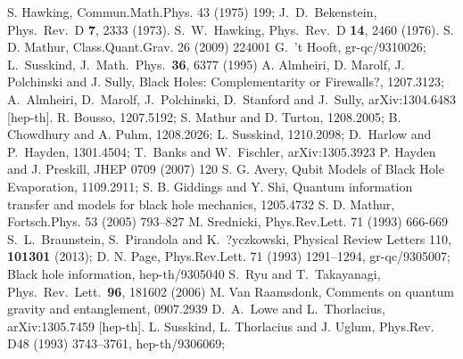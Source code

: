 \documentclass[12pt,onecolumn,aps,prd,nofootinbib,superscriptaddress,amssymb]{revtex4-1}
\begin{document}
\begin{thebibliography}{99}
 S. Hawking, %
Commun.Math.Phys. 43 (1975) 199;   J.~D.~Bekenstein, %
 Phys.\ Rev.\ D {\bf 7}, 2333 (1973).
   S.~W.~Hawking,
  Phys.\ Rev.\ D {\bf 14}, 2460 (1976).
    S. D. Mathur, %
 Class.Quant.Grav. 26 (2009) 224001%
  G.~'t Hooft,   gr-qc/9310026;  L.~Susskind,   J.\ Math.\ Phys.\  {\bf 36}, 6377 (1995) 
 A. Almheiri, D. Marolf, J. Polchinski and J. Sully, Black Holes: Complementarity or Firewalls?, 1207.3123;
 A.~Almheiri, D.~Marolf, J.~Polchinski, D.~Stanford and J.~Sully,
    arXiv:1304.6483 [hep-th].
R. Bousso, 1207.5192;
S. Mathur and D. Turton,   1208.2005;
B. Chowdhury and A. Puhm, 1208.2026;  
L. Susskind,  1210.2098; D.~Harlow and P.~Hayden, 1301.4504; T.~Banks and W.~Fischler,
 arXiv:1305.3923 
  P. Hayden and J. Preskill, %
JHEP 0709 (2007) 120
         S. G. Avery, Qubit Models of Black Hole Evaporation, 1109.2911;
S. B. Giddings and Y. Shi, Quantum information transfer and models for black hole mechanics, 1205.4732
        S. D. Mathur,  Fortsch.Phys. 53 (2005) 793--827
   M. Srednicki, Phys.Rev.Lett. 71 (1993) 666-669
  S.~L.~Braunstein, S.~Pirandola and K.~?yczkowski,
  Physical Review Letters 110, {\bf 101301} (2013);
          D. N. Page, %
Phys.Rev.Lett. 71 (1993) 1291--1294, gr-qc/9305007; Black hole information, hep-th/9305040
 S.~Ryu and T.~Takayanagi,
  Phys.\ Rev.\ Lett.\  {\bf 96}, 181602 (2006)
  M. Van Raamsdonk, Comments on quantum gravity and entanglement, 0907.2939%
  D.~A.~Lowe and L.~Thorlacius,
  arXiv:1305.7459 [hep-th].
  L. Susskind, L. Thorlacius and J. Uglum, Phys.Rev. D48 (1993) 3743--3761, hep-th/9306069;

\end{thebibliography}
\end{document}
